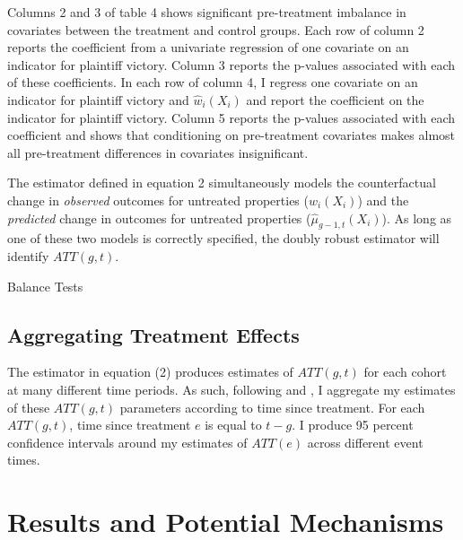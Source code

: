 \documentclass[12pt]{article}
\begin{document}
    Columns 2 and 3 of table 4 shows significant pre-treatment imbalance in covariates between the treatment and control groups. Each row of column 2 reports the coefficient from a univariate regression of one covariate on an indicator for plaintiff victory. Column 3 reports the p-values associated with each of these coefficients. In each row of column 4, I regress one covariate on an indicator for plaintiff victory and $\hat{w}_i(X_i)$ and report the coefficient on the indicator for plaintiff victory. Column 5 reports the p-values associated with each coefficient and shows that conditioning on pre-treatment covariates makes almost all pre-treatment differences in covariates insignificant.

    The estimator defined in equation 2 simultaneously models the counterfactual change in \emph{observed} outcomes for untreated properties ($\hat{w}_i(X_i)$) and the \emph{predicted} change in outcomes for untreated properties ($\hat{\mu}_{g-1, t}(X_i)$). As long as one of these two models is correctly specified, the doubly robust estimator will identify $ATT(g, t)$.

    \begin{landscape}
        
    \begin{table}[H]
        \centering
        
        \caption{Balance Tests}
        \label{tab:my_label}
    \end{table} 
    
    \end{landscape}


    \subsection{Aggregating Treatment Effects}
        The estimator in equation (2) produces estimates of $ATT(g, t)$ for each cohort at many different time periods. As such, following \cite{callaway_difference--differences_2021} and \cite{goodman-bacon_changes_2019}, I aggregate my estimates of these $ATT(g, t)$ parameters according to time since treatment. For each $ATT(g, t)$, time since treatment $e$ is equal to $t-g$. I produce 95 percent confidence intervals around my estimates of $ATT(e)$ across different event times.
    
\section{Results and Potential Mechanisms} \label{sec:result}
\end{document}
